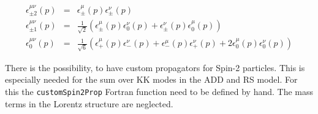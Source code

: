 \documentclass[a4paper,12pt]{amsart}
\begin{document}
\begin{eqnarray}
\epsilon^{\mu\nu}_{\pm2}(p) &=& \epsilon_\pm^\mu(p)\epsilon_\pm^\nu(p)\\
\epsilon^{\mu\nu}_{\pm1}(p) &=& \frac1{\sqrt2}\left(
	\epsilon_\pm^\mu(p)\epsilon_0^\nu(p)
       +\epsilon_\pm^\nu(p)\epsilon_0^\mu(p)\right)\\
\epsilon^{\mu\nu}_0(p) &=&\frac1{\sqrt6}\left(
        \epsilon_+^\mu(p)\epsilon_-^\nu(p)
       +\epsilon_-^\mu(p)\epsilon_+^\nu(p)
       +2\epsilon_0^\mu(p)\epsilon_0^\nu(p)\right)
\end{eqnarray}


There is the possibility, to have custom propagators for Spin-2 particles.
This is especially needed for the sum over KK modes in the ADD and RS model.
For this the \texttt{customSpin2Prop} Fortran function need to be defined by hand.
The mass terms in the Lorentz structure are neglected.
\end{document}
